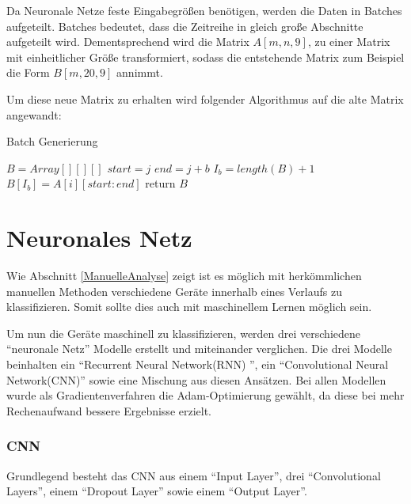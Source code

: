     Da Neuronale Netze feste Eingabegrößen benötigen, werden die Daten in Batches aufgeteilt.
    Batches bedeutet, dass die Zeitreihe in gleich große Abschnitte aufgeteilt wird.
    Dementsprechend wird die Matrix \( A[m, n, 9] \), zu einer Matrix mit einheitlicher Größe transformiert, sodass die entstehende Matrix zum Beispiel die Form \( B[m, 20, 9] \) annimmt.
    \newline

    \noindent
    Um diese neue Matrix zu erhalten wird folgender Algorithmus auf die alte Matrix angewandt:

    \begin{algorithm}\label{alg:BatchGenerierung}
        \caption{Batch Generierung}
        \begin{algorithmic}[1]
        \State{}
            \State ${B} = Array[][][]$
                    \State $start = j$
                    \State $end = j + b$ 
                    \State $I_b = length(B) + 1$
                    \State $B[I_b] = A[i][start : end]$
                \EndFor
            \EndFor
            \State return $B$
        \EndFunction
        \end{algorithmic}
    \end{algorithm}

\section{Neuronales Netz}
    Wie Abschnitt \ref{ManuelleAnalyse} zeigt ist es möglich mit herkömmlichen manuellen Methoden verschiedene Geräte innerhalb eines Verlaufs zu klassifizieren.
    Somit sollte dies auch mit maschinellem Lernen möglich sein.
    \newline

    \noindent
    Um nun die Geräte maschinell zu klassifizieren, werden drei verschiedene "`neuronale Netz"' Modelle erstellt und miteinander verglichen.
    Die drei Modelle beinhalten ein "`Recurrent Neural Network(RNN) "', ein "`Convolutional Neural Network(CNN)"' sowie eine Mischung aus diesen Ansätzen. 
    Bei allen Modellen wurde als Gradientenverfahren die Adam-Optimierung gewählt, da diese bei mehr Rechenaufwand bessere Ergebnisse erzielt.    

    \subsubsection{CNN}
    Grundlegend besteht das \ac{CNN} aus einem "`Input Layer"', drei "`Convolutional Layers"', einem "`Dropout Layer"' sowie einem "`Output Layer"'.
    \newline

